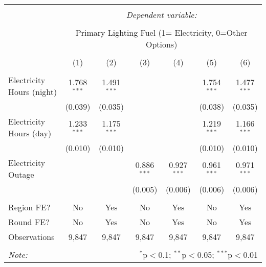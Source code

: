 
\begin{tabular}{@{\extracolsep{5pt}}lcccccc} 
\\[-1.8ex]\hline 
\hline \\[-1.8ex] 
 & \multicolumn{6}{c}{\textit{Dependent variable:}} \\ 
\cline{2-7} 
\\[-1.8ex] & \multicolumn{6}{c}{Primary Lighting Fuel (1= Electricity, 0=Other Options)} \\ 
\\[-1.8ex] & (1) & (2) & (3) & (4) & (5) & (6)\\ 
\hline \\[-1.8ex] 
 Electricity Hours (night) & 1.768$^{***}$ & 1.491$^{***}$ &  &  & 1.754$^{***}$ & 1.477$^{***}$ \\ 
  & (0.039) & (0.035) &  &  & (0.038) & (0.035) \\ 
  Electricity Hours (day) & 1.233$^{***}$ & 1.175$^{***}$ &  &  & 1.219$^{***}$ & 1.166$^{***}$ \\ 
  & (0.010) & (0.010) &  &  & (0.010) & (0.010) \\ 
  Electricity Outage &  &  &0.886$^{***}$  & 0.927$^{***}$ & 0.961$^{***}$ & 0.971$^{***}$ \\ 
  &  &  & (0.005) & (0.006) & (0.006) & (0.006) \\ 
 \hline \\[-1.8ex] 
Region FE? & No & Yes & No & Yes & No & Yes \\ 
Round FE? & No & Yes & No & Yes & No & Yes \\ 
Observations & 9,847 & 9,847 & 9,847 & 9,847 & 9,847 & 9,847 \\ 
\hline 
\hline \\[-1.8ex] 
\textit{Note:}  & \multicolumn{6}{r}{$^{*}$p$<$0.1; $^{**}$p$<$0.05; $^{***}$p$<$0.01} \\ 
\end{tabular}
